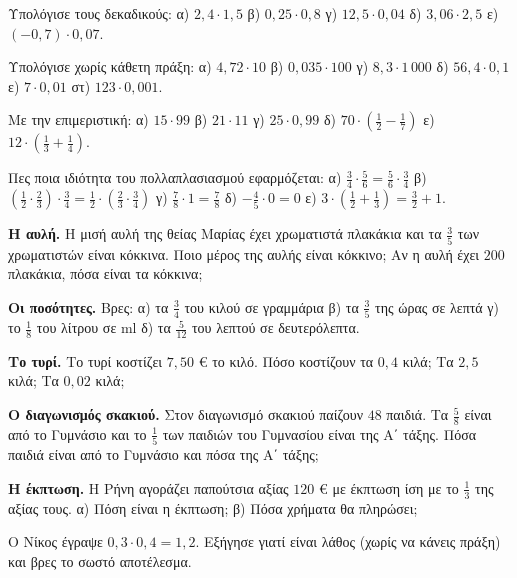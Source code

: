 \ex Υπολόγισε τους δεκαδικούς: α) $2{,}4\cdot1{,}5$ \quad β) $0{,}25\cdot0{,}8$ \quad γ) $12{,}5\cdot0{,}04$ \quad δ) $3{,}06\cdot2{,}5$ \quad ε) $(-0{,}7)\cdot0{,}07$.

\ex Υπολόγισε χωρίς κάθετη πράξη: α) $4{,}72\cdot10$ \quad β) $0{,}035\cdot100$ \quad γ) $8{,}3\cdot1\,000$ \quad δ) $56{,}4\cdot0{,}1$ \quad ε) $7\cdot0{,}01$ \quad στ) $123\cdot0{,}001$.

\ex Με την επιμεριστική: α) $15\cdot99$ \quad β) $21\cdot11$ \quad γ) $25\cdot0{,}99$ \quad δ) $70\cdot\left(\frac{1}{2}-\frac{1}{7}\right)$ \quad ε) $12\cdot\left(\frac{1}{3}+\frac{1}{4}\right)$.

\ex Πες ποια ιδιότητα του πολλαπλασιασμού εφαρμόζεται: α) $\frac{3}{4}\cdot\frac{5}{6}=\frac{5}{6}\cdot\frac{3}{4}$ \quad β) $\left(\frac{1}{2}\cdot\frac{2}{3}\right)\cdot\frac{3}{4}=\frac{1}{2}\cdot\left(\frac{2}{3}\cdot\frac{3}{4}\right)$ \quad γ) $\frac{7}{8}\cdot1=\frac{7}{8}$ \quad δ) $-\frac{4}{5}\cdot0=0$ \quad ε) $3\cdot\left(\frac{1}{2}+\frac{1}{3}\right)=\frac{3}{2}+1$.


\ex \textbf{Η αυλή.} Η μισή αυλή της θείας Μαρίας έχει χρωματιστά πλακάκια και τα $\frac{3}{5}$ των χρωματιστών είναι κόκκινα. Ποιο μέρος της αυλής είναι κόκκινο; Αν η αυλή έχει $200$ πλακάκια, πόσα είναι τα κόκκινα;

\ex \textbf{Οι ποσότητες.} Βρες: α) τα $\frac{3}{4}$ του κιλού σε γραμμάρια \quad β) τα $\frac{3}{5}$ της ώρας σε λεπτά \quad γ) το $\frac{1}{8}$ του λίτρου σε ml \quad δ) τα $\frac{5}{12}$ του λεπτού σε δευτερόλεπτα.

\ex \textbf{Το τυρί.} Το τυρί κοστίζει $7{,}50$ € το κιλό. Πόσο κοστίζουν τα $0{,}4$ κιλά; Τα $2{,}5$ κιλά; Τα $0{,}02$ κιλά;

\ex \textbf{Ο διαγωνισμός σκακιού.} Στον διαγωνισμό σκακιού παίζουν $48$ παιδιά. Τα $\frac{5}{8}$ είναι από το Γυμνάσιο και το $\frac{1}{5}$ των παιδιών του Γυμνασίου είναι της Α΄ τάξης. Πόσα παιδιά είναι από το Γυμνάσιο και πόσα της Α΄ τάξης;

\ex \textbf{Η έκπτωση.} Η Ρήνη αγοράζει παπούτσια αξίας $120$ € με έκπτωση ίση με το $\frac{1}{3}$ της αξίας τους. α) Πόση είναι η έκπτωση; β) Πόσα χρήματα θα πληρώσει;


\ex Ο Νίκος έγραψε $0{,}3\cdot0{,}4=1{,}2$. Εξήγησε γιατί είναι λάθος (χωρίς να κάνεις πράξη) και βρες το σωστό αποτέλεσμα.

